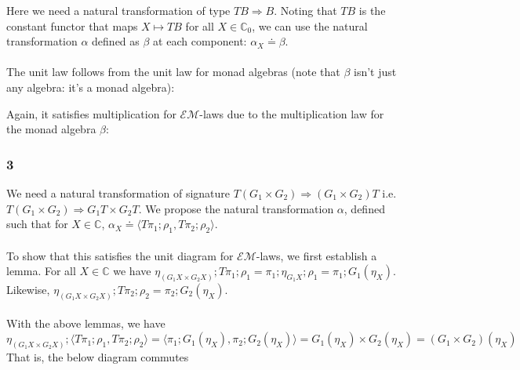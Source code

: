 \documentclass{article}
\begin{document}
Here we need a natural transformation of type $TB \Rightarrow B$. Noting that $TB$ is the constant 
functor that maps $X \mapsto TB$ for all $X \in \mathbb C_0$, we can use the natural transformation
$\alpha$ defined as $\beta$ at each component: $\alpha_X \doteq \beta$.
\\~\\
The unit law follows from the unit law for monad algebras (note that $\beta$ isn't just any algebra: it's a monad algebra):
\begin{center}
\end{center}
Again, it satisfies multiplication for $\mathcal{EM}$-laws due to the multiplication law for the monad algebra $\beta$:
\begin{center}
\end{center}

\subsubsection*{3}

We need a natural transformation of signature $T(G_1 \times G_2) \Rightarrow (G_1 \times G_2)T$ i.e.
$T(G_1 \times G_2) \Rightarrow G_1T \times G_2T$. We propose the natural transformation $\alpha$, 
defined such that for $X \in \mathbb C$, $\alpha_X \doteq \langle T\pi_1;\rho_1, T\pi_2;\rho_2 \rangle$.
\\~\\
To show that this satisfies the unit diagram for $\mathcal{EM}$-laws, we first establish a lemma.
For all $X \in \mathbb C$ we have $\eta_{(G_1X \times G_2X)};T \pi_1;\rho_1 = \pi_1;\eta_{G_1 X};\rho_1 = \pi_1;G_1(\eta_X)$.
Likewise, $\eta_{(G_1X \times G_2X)};T \pi_2;\rho_2 = \pi_2;G_2(\eta_X)$.
\\~\\
With the above lemmas, we have 
$$\eta_{(G_1X \times G_2X)};\langle T \pi_1; \rho_1, T \pi_2; \rho_2 \rangle = 
\langle \pi_1;G_1(\eta_X), \pi_2;G_2(\eta_X) \rangle = G_1(\eta_X) \times G_2(\eta_X) = (G_1 \times G_2)(\eta_X)$$
That is, the below diagram commutes
\end{document}
